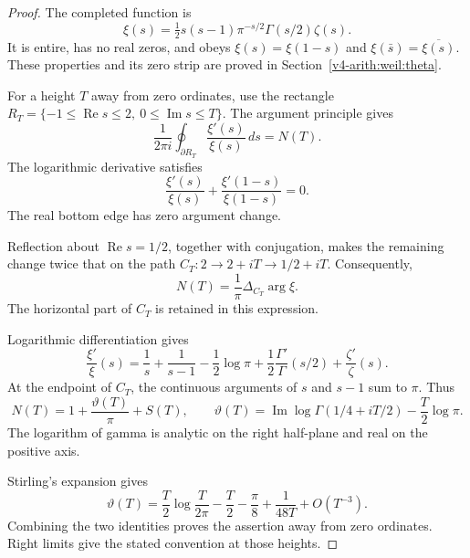\begin{proof}
The completed function is
\begin{equation}
\label{v4-arith:w5-i:eq:xi-factorisation}
 \xi(s)=\tfrac12s(s-1)\pi^{-s/2}\Gamma(s/2)\zeta(s).
\end{equation}
It is entire, has no real zeros, and obeys
\(\xi(s)=\xi(1-s)\) and
\(\xi(\bar s)=\overline{\xi(s)}\).
These properties and its zero strip are proved in
Section~\ref{v4-arith:weil:theta}.

For a height \(T\) away from zero ordinates, use the rectangle
\(R_T=\{-1\le\operatorname{Re}s\le2,\ 0\le\operatorname{Im}s\le T\}\).
The argument principle gives
\begin{equation}
\label{v4-arith:w5-i:eq:contour}
 \frac1{2\pi i}\oint_{\partial R_T}\frac{\xi'(s)}{\xi(s)}\,ds=N(T).
\end{equation}
The logarithmic derivative satisfies
\begin{equation}
\label{v4-arith:w5-i:eq:log-der-sym}
 \frac{\xi'(s)}{\xi(s)}+
                 \frac{\xi'(1-s)}{\xi(1-s)}=0.
\end{equation}
The real bottom edge has zero argument change.

Reflection about \(\operatorname{Re}s=1/2\), together with conjugation,
makes the remaining change twice that on the path
\(C_T:2\to2+iT\to1/2+iT\). Consequently,
\begin{equation}
\label{v4-arith:w5-i:eq:vert-sum}
 N(T)=\frac1\pi\Delta_{C_T}\arg\xi.
\end{equation}
The horizontal part of \(C_T\) is retained in this expression.

Logarithmic differentiation gives
\begin{equation}
\label{v4-arith:w5-i:eq:log-xi-prime}
 \frac{\xi'}\xi(s)=\frac1s+\frac1{s-1}-\frac12\log\pi
             +\frac12\frac{\Gamma'}\Gamma(s/2)+\frac{\zeta'}\zeta(s).
\end{equation}
At the endpoint of \(C_T\), the continuous arguments of \(s\) and
\(s-1\) sum to \(\pi\). Thus
\[
 N(T)=1+\frac{\vartheta(T)}\pi+S(T),\qquad
 \vartheta(T)=\operatorname{Im}\log\Gamma(1/4+iT/2)-\frac T2\log\pi.
\]
The logarithm of gamma is analytic on the right half-plane and real on
the positive axis.

Stirling's expansion gives
\begin{equation}
\label{v4-arith:w5-i:eq:stirling-gamma}
 \vartheta(T)=\frac T2\log\frac{T}{2\pi}-\frac T2
                     -\frac\pi8+\frac1{48T}+O(T^{-3}).
\end{equation}
Combining the two identities proves the assertion away from zero
ordinates. Right limits give the stated convention at those heights.
\end{proof}

